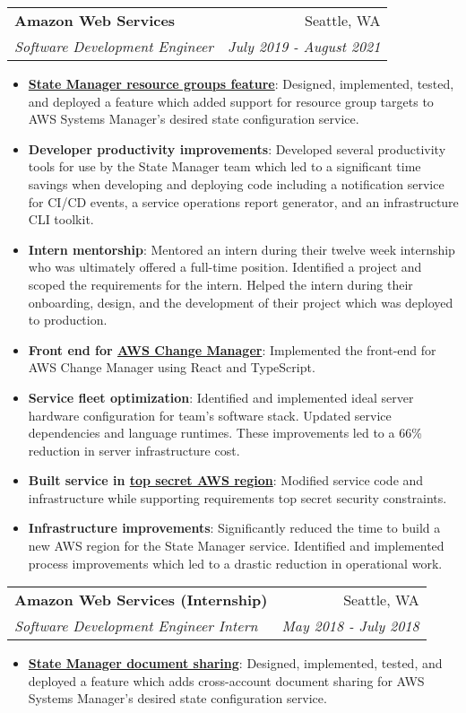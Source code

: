 \documentclass[letterpaper,11pt]{article}
\makeatletter
\newcommand{\resumeItem}[2]{
  \item\small{
    \textbf{#1}{: #2 \vspace{-2pt}}
  }
}
\newcommand{\resumeSubheading}[4]{
  \vspace{-1pt}\item
    \begin{tabular*}{0.97\textwidth}[t]{l@{\extracolsep{\fill}}r}
      \textbf{#1} & #2 \\
      \textit{\small#3} & \textit{\small #4} \\
    \end{tabular*}\vspace{-5pt}
}
\newcommand{\resumeItemListStart}{\begin{itemize}}
\newcommand{\resumeItemListEnd}{\end{itemize}\vspace{-5pt}}
\makeatother
\begin{document}
    \resumeSubheading
      {Amazon Web Services}{Seattle, WA}
      {Software Development Engineer}{July 2019 - August 2021}
      \resumeItemListStart
        \resumeItem{\href{https://aws.amazon.com/about-aws/whats-new/2020/05/aws-systems-manager-now-supports-resource-groups-as-targets-for-state-manager/}{State Manager resource groups feature}}
          {Designed, implemented, tested, and deployed a feature which added support for resource group targets to AWS Systems Manager's desired state configuration service.}
        \resumeItem{Developer productivity improvements}{Developed several productivity tools for use by the State Manager team which led to a significant time savings when developing and deploying code including a notification service for CI/CD events, a service operations report generator, and an infrastructure CLI toolkit.}
        \resumeItem{Intern mentorship}{Mentored an intern during their twelve week internship who was ultimately offered a full-time position. Identified a project and scoped the requirements for the intern. Helped the intern during their onboarding, design, and the development of their project which was deployed to production.}
        \resumeItem{Front end for \href{https://docs.aws.amazon.com/systems-manager/latest/userguide/change-manager.html}{AWS Change Manager}}{Implemented the front-end for AWS Change Manager using React and TypeScript.}
        \resumeItem{Service fleet optimization}
          {Identified and implemented ideal server hardware configuration for team's software stack. Updated service dependencies and language runtimes. These improvements led to a 66\% reduction in server infrastructure cost.}
        \resumeItem{Built service in \href{https://aws.amazon.com/blogs/publicsector/announcing-the-new-aws-secret-region/}{top secret AWS region}}{Modified service code and infrastructure while supporting requirements top secret security constraints.}
        \resumeItem{Infrastructure improvements}{Significantly reduced the time to build a new AWS region for the State Manager service. Identified and implemented process improvements which led to a drastic reduction in operational work.}
        \resumeItemListEnd

    \resumeSubheading
      {Amazon Web Services (Internship)}{Seattle, WA}
      {Software Development Engineer Intern}{May 2018 - July 2018}
      \resumeItemListStart
        \resumeItem{\href{https://aws.amazon.com/about-aws/whats-new/2019/02/aws-systems-manager-state-manager-enables-document-sharing-across-accounts/}{State Manager document sharing}}
          {Designed, implemented, tested, and deployed a feature which adds cross-account document sharing for AWS Systems Manager's desired state configuration  service.}
      \resumeItemListEnd
\end{document}
